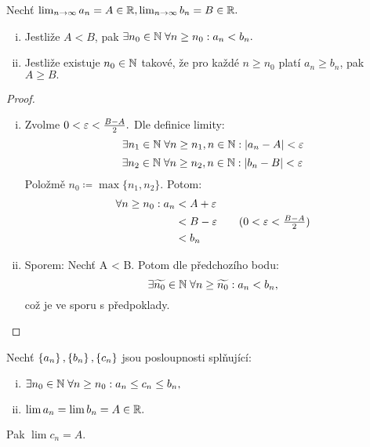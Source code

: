 \begin{theorem}
    \label{th:limitaausporadani}
    Nechť $\lim_{n\to\infty} a_n = A \in \mathbb{R}, \lim_{n\to\infty}b_n = B \in \mathbb{R}.$
    \begin{enumerate}[i.]
        \item Jestliže $A < B$, pak $\exists n_0 \in \mathbb{N} \; \forall n \geq n_0: 
            a_n < b_n.$
        \item Jestliže existuje $n_0 \in \mathbb{N}$ takové, že pro každé $n \geq n_0$ 
            platí $a_n \geq b_n$, pak $A \geq B.$
    \end{enumerate}
\end{theorem}

\begin{proof}
    \leavevmode
    \begin{enumerate}[i.]
        \item
            Zvolme $0<\varepsilon < \frac{B-A}{2}.$ Dle definice limity:
            $$\exists n_1 \in \mathbb{N} \; \forall n \geq n_1, n \in \mathbb{N}: |a_n - A| < \varepsilon$$
            $$\exists n_2 \in \mathbb{N} \; \forall n \geq n_2, n \in \mathbb{N}: |b_n - B| < \varepsilon$$
            Položmě $n_0 \coloneqq \max\{n_1,n_2\}$. Potom:
            \begin{align*}
                \fa n \geq n_0: a_n &< A+\e \\
                                                      &< B-\e \tag{$0<\e < \frac{B-A}{2}$} \\
                                                      &< b_n
            \end{align*}

        \item Sporem: Nechť A < B. Potom dle předchozího bodu:
            $$\exists \widetilde{n_0} \in \mathbb{N} \; \forall n \geq \widetilde{n_0}: 
            a_n < b_n,$$
            což je ve sporu s předpoklady.
    \end{enumerate}
\end{proof}

\begin{theorem}
    \label{th:dvastraznici}
    Nechť $\left\{a_n\right\}, \left\{b_n\right\}, \left\{c_n\right\}$ jsou posloupnosti splňující:
    \begin{enumerate}[i.]
        \item $\exists n_0 \in \mathbb{N} \; \forall n \geq n_0: a_n \leq c_n \leq b_n,$
        \item $\lim a_n = \lim b_n = A \in \mathbb{R}.$
    \end{enumerate}
    Pak $\lim c_n = A.$
\end{theorem}

